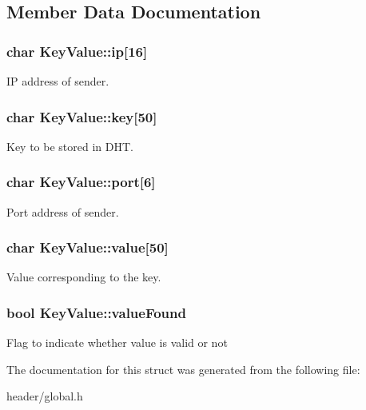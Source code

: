 \subsection{Member Data Documentation}
\hypertarget{structKeyValue_a925635eab00a78fd446a3c55c309b7f3}{
\subsubsection[{ip}]{\setlength{\rightskip}{0pt plus 5cm}char Key\-Value\-::ip\mbox{[}16\mbox{]}}}\label{structKeyValue_a925635eab00a78fd446a3c55c309b7f3}
I\-P address of sender. \hypertarget{structKeyValue_a471911f5705e5260474fb8c8fb654d85}{
\subsubsection[{key}]{\setlength{\rightskip}{0pt plus 5cm}char Key\-Value\-::key\mbox{[}50\mbox{]}}}\label{structKeyValue_a471911f5705e5260474fb8c8fb654d85}
Key to be stored in D\-H\-T. \hypertarget{structKeyValue_a888b790a99542bbeaa2533adb59bf1ae}{
\subsubsection[{port}]{\setlength{\rightskip}{0pt plus 5cm}char Key\-Value\-::port\mbox{[}6\mbox{]}}}\label{structKeyValue_a888b790a99542bbeaa2533adb59bf1ae}
Port address of sender. \hypertarget{structKeyValue_aecdacf280bd6aaba9bde2ab8be9bc8d6}{
\subsubsection[{value}]{\setlength{\rightskip}{0pt plus 5cm}char Key\-Value\-::value\mbox{[}50\mbox{]}}}\label{structKeyValue_aecdacf280bd6aaba9bde2ab8be9bc8d6}
Value corresponding to the key. \hypertarget{structKeyValue_afbdc219b834bb70070e683b96e80a7d4}{
\subsubsection[{value\-Found}]{\setlength{\rightskip}{0pt plus 5cm}bool Key\-Value\-::value\-Found}}\label{structKeyValue_afbdc219b834bb70070e683b96e80a7d4}
Flag to indicate whether value is valid or not 

The documentation for this struct was generated from the following file\-:\begin{DoxyCompactItemize}
\item 
header/global.\-h\end{DoxyCompactItemize}
